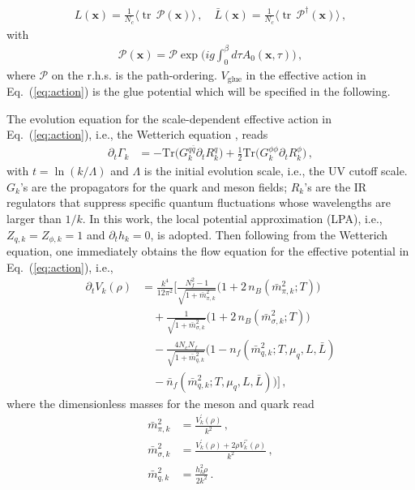 \documentclass[%
reprint,
superscriptaddress,
showpacs,preprintnumbers,
 amsmath,amssymb,
 aps,
prd,
]{revtex4-1}
\newcommand{\tr}{\ensuremath{\operatorname{tr}}}
\def\Eq#1{Eq.~(\ref{#1})}
\begin{document}
\begin{align}
  L(\bm{x})=\frac{1}{N_c} \langle \tr\, \mathcal{P}(\bm x)\rangle\,,\quad  \bar L (\bm x)=\frac {1}{N_c} \langle \tr\,\mathcal{P}^{\dagger}(\bm x)\rangle \,,\label{eq:Lloop}
\end{align}
with
\begin{align}
  \mathcal{P}(\bm x)= \mathcal{P}\exp\bigg(ig\int_0^{\beta}d\tau A_0(\bm{x},\tau)\bigg)\,,\label{eq:Ploop}
\end{align}
where $\mathcal{P}$ on the r.h.s. is the path-ordering. $V_\text{glue}$ in the effective action in \Eq{eq:action} is the glue potential which will be specified in the following.

The evolution equation for the scale-dependent effective action in \Eq{eq:action}, i.e., the Wetterich equation \cite{Wetterich:1992yh}, reads
\begin{align}
  \partial_{t}\Gamma_{k}&=-\mathrm{Tr}\big(G^{q\bar q}_{k}\partial_{t} R^{q}_{k}\big)+\frac{1}{2}\mathrm{Tr}\big(G^{\phi\phi}_{k}\partial_{t} R^{\phi}_{k}\big)\,,
 \label{eq:WetterichEqPQM}
\end{align}
with $t=\ln (k/\Lambda)$ and $\Lambda$ is the initial evolution scale, i.e., the UV cutoff scale. $G_{k}$'s are the propagators for the quark and meson fields; $R_k$'s are the IR regulators that suppress specific quantum fluctuations whose wavelengths are larger than $1/k$. In this work, the local potential approximation (LPA), i.e., $Z_{q,k}=Z_{\phi,k}=1$ and $\partial_t h_{k}=0$, is adopted. Then following from the Wetterich equation,  one immediately obtains the flow equation for the effective potential in \Eq{eq:action}, i.e.,
\begin{align} 
  \partial_{t}V_{k}(\rho)&=\frac{k^{4}}{12\pi^{2}}\bigg[\frac{N_{f}^{2}-1}{\sqrt{1+\bar{m}_{\pi,k}^{2}}}\Big(1+2\,n_B(\bar{m}_{\pi,k}^{2};T)\Big)\nonumber\\[2ex]
  &\quad+\frac{1}{\sqrt{1+\bar{m}_{\sigma,k}^{2}}}\Big(1+2\,n_B(\bar{m}_{\sigma,k}^{2};T)\Big)\nonumber\\[2ex]
  &\quad-\frac{4N_{c}N_{f}}{\sqrt{1+\bar{m}_{q,k}^{2}}}\Big(1-n_f(\bar{m}_{q,k}^{2};T,\mu_q,L,\bar L)\nonumber\\[2ex]
  &\quad-\bar n_f(\bar{m}_{q,k}^{2};T,\mu_q,L,\bar L)\Big)\bigg]\,,\label{eq:Vflow}
\end{align}
where the dimensionless masses for the meson and quark read
\begin{align} 
  \bar{m}_{\pi,k}^{2}&=\frac{V_{k}^{\prime}(\rho)}{k^{2}}\,,\nonumber\\[2ex] 
  \bar{m}_{\sigma,k}^{2}&=\frac{V_{k}^{\prime}(\rho)+2\rho V_{k}^{\prime\prime}(\rho)}{k^{2}}\,,\nonumber\\[2ex]
  \bar{m}_{q,k}^{2}&=\frac{h_{k}^{2}\rho}{2k^{2}}\,. \label{eq:mass} 
\end{align}
\end{document}
